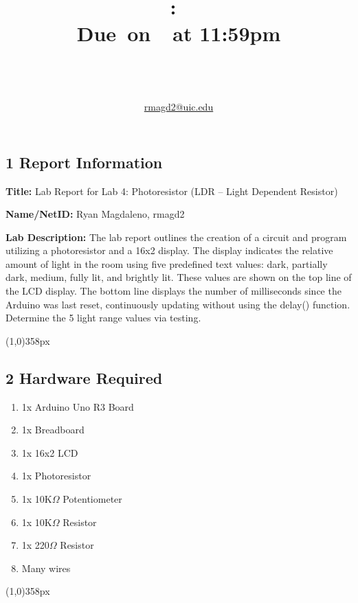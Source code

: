\documentclass{article}
\title{
    \vspace{2in}
    \textmd{\textbf{\hmwkClass:\ \hmwkTitle}}\\
    \normalsize\vspace{0.1in}\small{Due\ on\ \hmwkDueDate\ at 11:59pm}\\
    \vspace{0.1in}\large{\textit{\hmwkClassInstructor\ \hmwkClassTime}}
    \vspace{3in}
}
\author{\hmwkAuthorName\\\href{mailto:rmagd2@uic.edu}{rmagd2@uic.edu}}
\date{}
\newcommand{\enterProblemHeader}[1]{
}
\newcommand{\exitProblemHeader}[1]{
}
\newcounter{partCounter}
\newcounter{homeworkProblemCounter}
\newenvironment{homeworkProblem}[1]{
    \setcounter{partCounter}{1}
}{
}
\newcommand{\hwline}{\begin{center}\line(1,0){358px}\end{center}}
\begin{document}
\maketitle

\pagebreak


\begin{homeworkProblem}{}
    \subsection{1 Report Information}
    \textbf{Title:} Lab Report for Lab 4: Photoresistor (LDR – Light Dependent Resistor)

    \textbf{Name/NetID:} Ryan Magdaleno, rmagd2

    \textbf{Lab Description:} The lab report outlines the creation of a circuit and 
    program utilizing a photoresistor and a 16x2 display. The display indicates the 
    relative amount of light in the room using five predefined text values: dark, 
    partially dark, medium, fully lit, and brightly lit. These values are shown on the 
    top line of the LCD display. The bottom line displays the number of milliseconds 
    since the Arduino was last reset, continuously updating without using the delay() 
    function. Determine the 5 light range values via testing.
    \hwline
\end{homeworkProblem}


\begin{homeworkProblem}{}
    \vspace{-20pt}\subsection{2 Hardware Required}
    \begin{enumerate}
        \item \vspace{-5pt}
        1x Arduino Uno R3 Board
        \item \vspace{-5pt}
        1x Breadboard
        \item \vspace{-5pt}
        1x 16x2 LCD
        \item \vspace{-5pt}
        1x Photoresistor
        \item \vspace{-5pt}
        1x 10K$\Omega$ Potentiometer
        \item \vspace{-5pt}
        1x 10K$\Omega$ Resistor
        \item \vspace{-5pt}
        1x 220$\Omega$ Resistor
        \item \vspace{-5pt}
        Many wires
    \end{enumerate}
    \hwline
\end{homeworkProblem}
\end{document}
